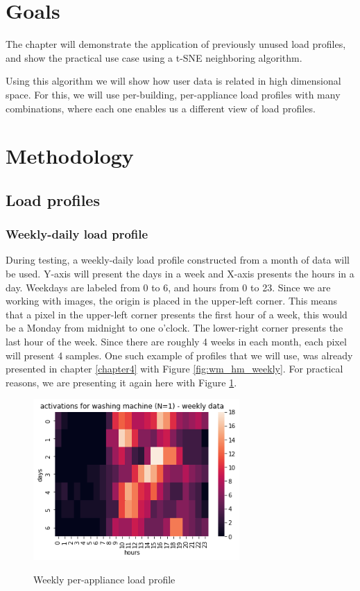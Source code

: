 \section{Goals}

The chapter will demonstrate the application of previously unused load profiles,
and show the practical use case using a t-SNE neighboring algorithm.

Using this algorithm we will show how user data is related in high dimensional space.
For this, we will use per-building, per-appliance load profiles with many combinations, where
each one enables us a different view of load profiles. 

\section{Methodology}

\subsection{Load profiles}

\subsubsection{Weekly-daily load profile}

During testing, a weekly-daily load profile constructed from a month of data will be used.
Y-axis will present the days in a week and X-axis presents the hours in a day.
Weekdays are labeled from 0 to 6, and hours from 0 to 23.
Since we are working with images, the origin is placed in the upper-left corner. 
This means that a pixel in the upper-left corner presents the first hour of a week,
this would be a Monday from midnight to one o'clock. 
The lower-right corner presents the last hour of the week.
Since there are roughly 4 weeks in each month, each pixel will present 4 samples. 
One such example of profiles that we will use, was already presented in chapter \ref{chapter4} with Figure \ref{fig:wm_hm_weekly}.
For practical reasons, we are presenting it again here with Figure \ref{fig:wm_hm_weekly_2}.

\begin{figure}[H]
	\centering
	\caption{Weekly per-appliance load profile}
	\includegraphics[width=0.7\textwidth]{../Figures/LPS/wm_hm_weekly.png}
	\label{fig:wm_hm_weekly_2}
\end{figure}

